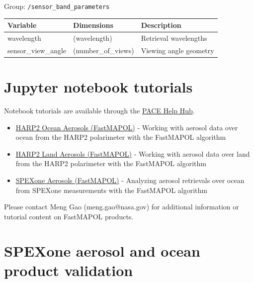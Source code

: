\documentclass[
  letterpaper,
  open=any]{scrbook}
\providecommand{\tightlist}{%
  \setlength{\itemsep}{0pt}\setlength{\parskip}{0pt}}
\begin{document}
Group: \texttt{/sensor\_band\_parameters}

\begin{longtable}[]{@{}lll@{}}
\toprule\noalign{}
Variable & Dimensions & Description \\
\midrule\noalign{}
\endhead
\bottomrule\noalign{}
\endlastfoot
wavelength & (wavelength) & Retrieval wavelengths \\
sensor\_view\_angle & (number\_of\_views) & Viewing angle geometry \\
\end{longtable}


\chapter{Jupyter notebook tutorials}\label{jupyter-notebook-tutorials}

Notebook tutorials are available through the
\href{https://nasa.github.io/oceandata-notebooks/sections/cloud-atmosphere.html}{PACE
Help Hub}.

\begin{itemize}
\tightlist
\item
  \href{https://nasa.github.io/oceandata-notebooks/notebooks/harp2/harp2_l2_fastmapol_aerosol_ocean_product.html}{HARP2
  Ocean Aerosols (FastMAPOL)} - Working with aerosol data over ocean
  from the HARP2 polarimeter with the FastMAPOL algorithm
\item
  \href{https://nasa.github.io/oceandata-notebooks/notebooks/harp2/harp2_l2_fastmapol_aerosol_land_product.html}{HARP2
  Land Aerosols (FastMAPOL)} - Working with aerosol data over land from
  the HARP2 polarimeter with the FastMAPOL algorithm
\item
  \href{https://nasa.github.io/oceandata-notebooks/notebooks/spexone/spexone_l2_fastmapol_aerosol_product.html}{SPEXone
  Aerosols (FastMAPOL)} - Analyzing aerosol retrievals over ocean from
  SPEXone measurements with the FastMAPOL algorithm
\end{itemize}

Please contact Meng Gao (meng.gao@nasa.gov) for additional information
or tutorial content on FastMAPOL products.


\chapter{SPEXone aerosol and ocean product
validation}\label{spexone-aerosol-and-ocean-product-validation}
\end{document}
